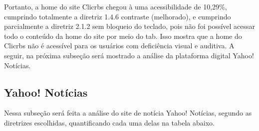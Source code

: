 \documentclass[a4paper]{article}
\begin{document}
\begin{titlepage}
Portanto, a home do site Clicrbs chegou à uma acessibilidade de 10,29\%, cumprindo totalmente a diretriz 1.4.6 contraste (melhorado), e cumprindo parcialmente a diretriz 2.1.2 sem bloqueio do teclado, pois não foi possível acessar todo o conteúdo da home do site por meio do tab. Isso mostra que a home do Clicrbs não é acessível para os usuários com deficiência visual e auditiva. A seguir, na próxima subseção será mostrado a análise da plataforma digital Yahoo! Notícias.

\subsection{Yahoo! Notícias}

Nessa subseção será feita a análise do site de notícia Yahoo! Notícias, segundo as diretrizes escolhidas, quantificando cada uma delas na tabela abaixo.\\


\end{titlepage}
\end{document}
